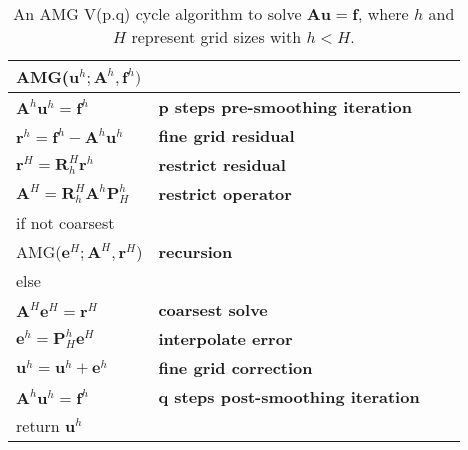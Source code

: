 \begin{table}\center
\begin{tabular}{|l|l|ll}
\hline
AMG($\mathbf{u}^h;\mathbf{A}^h,\mathbf{f}^h)$ &\\ \hline
    \quad $\mathbf{A}^h\mathbf{u}^h=\mathbf{f}^h$ & \textbf{p steps pre-smoothing iteration}\\
	\quad $\mathbf{r}^h=\mathbf{f}^h-\mathbf{A}^h \mathbf{u}^h$ & \textbf{fine grid residual}\\
	\quad $\mathbf{r}^H=\mathbf{R}_h^H \mathbf{r}^h$ & \textbf{restrict residual} \\
	\quad $\mathbf{A}^H=\mathbf{R}_h^{H} \mathbf{A}^h \mathbf{P}_H^h$& \textbf{restrict operator}\\
	\quad if not coarsest  &\\
	  \quad\quad AMG($\mathbf{e}^H;\mathbf{A}^H,\mathbf{r}^H$) &\textbf{recursion}\\
	  \quad else &\\
	  \quad\quad $\mathbf{A}^H\mathbf{e}^H=\mathbf{r}^H$ & \textbf{coarsest solve}\\
	\quad$\mathbf{e}^h=\mathbf{P}_H^h \mathbf{e}^H$ & \textbf{interpolate error} \\
	\quad$\mathbf{u}^h=\mathbf{u}^h+\mathbf{e}^h$ & \textbf{fine grid correction}\\
	\quad$\mathbf{A}^h\mathbf{u}^h=\mathbf{f}^h$ & \textbf{q steps post-smoothing iteration}\\
	\quad return $\mathbf{u}^h$ &\\
\hline
\end{tabular}\caption{An AMG V(p.q) cycle algorithm to solve $\mathbf{A}\mathbf{u}=\mathbf{f}$, where $h$ and $H$ represent grid sizes with $h<H$.}
\end{table}


